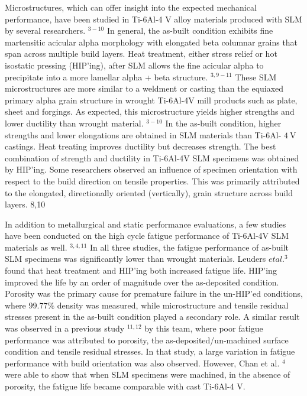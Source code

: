 \documentclass[10pt]{article}
\begin{document}
Microstructures, which can offer insight into the expected mechanical performance, have been studied in Ti-6Al-4 V alloy materials produced with SLM by several researchers. ${ }^{3-10}$ In general, the as-built condition exhibits fine martensitic acicular alpha morphology with elongated beta columnar grains that span across multiple build layers. Heat treatment, either stress relief or hot isostatic pressing (HIP'ing), after SLM allows the fine acicular alpha to precipitate into a more lamellar alpha + beta structure. ${ }^{3,9-11}$ These SLM microstructures are more similar to a weldment or casting than the equiaxed primary alpha grain structure in wrought Ti-6Al-4V mill products such as plate, sheet and forgings. As expected, this microstructure yields higher strengths and lower ductility than wrought material. ${ }^{3-10}$ In the as-built condition, higher strengths and lower elongations are obtained in SLM materials than Ti-6Al- $4 \mathrm{~V}$ castings. Heat treating improves ductility but decreases strength. The best combination of strength and ductility in Ti-6Al-4V SLM specimens was obtained by HIP'ing. Some researchers observed an influence of specimen orientation with respect to the build direction on tensile properties. This was primarily attributed to the elongated, directionally oriented (vertically), grain structure across build layers. 8,10

In addition to metallurgical and static performance evaluations, a few studies have been conducted on the high cycle fatigue performance of Ti-6Al-4V SLM materials as well. ${ }^{3,4,11}$ In all three studies, the fatigue performance of as-built SLM specimens was significantly lower than wrought materials. Leuders $e t a l .{ }^{3}$ found that heat treatment and HIP'ing both increased fatigue life. HIP'ing improved the life by an order of magnitude over the as-deposited condition. Porosity was the primary cause for premature failure in the un-HIP'ed conditions, where $99.77 \%$ density was measured, while microstructure and tensile residual stresses present in the as-built condition played a secondary role. A similar result was observed in a previous study ${ }^{11,12}$ by this team, where poor fatigue performance was attributed to porosity, the as-deposited/un-machined surface condition and tensile residual stresses. In that study, a large variation in fatigue performance with build orientation was also observed. However, Chan et al. ${ }^{4}$ were able to show that when SLM specimens were machined, in the absence of porosity, the fatigue life became comparable with cast Ti-6Al-4 V.
\end{document}
